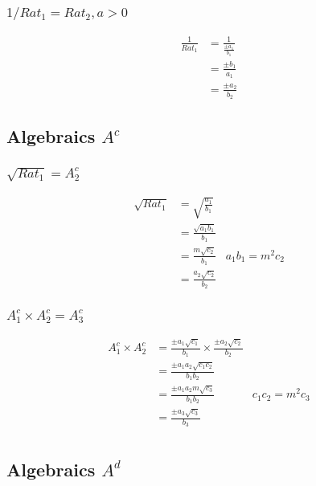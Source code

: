 \documentclass{article}
\begin{document}
\subsubsection{$1 / Rat_1 = Rat_2, a > 0$}
\begin{align*}
\frac{1}{Rat_1} &= \frac{1}{\frac{\pm a_1}{b_1}}\\
 &= \frac{\pm b_1}{a_1} \\
 &= \frac{\pm a_2}{b_2}
\end{align*}

\subsection{Algebraics $A^c$}

\subsubsection{$\sqrt{Rat_1} = A^c_2$}
\begin{align*}
\sqrt{Rat_1} &= \sqrt{\frac{a_1}{b_1}}\\
  &= \frac{\sqrt{a_1b_1}}{b_1}\\
  &= \frac{m\sqrt{c_2}}{b_1}    & a_1b_1 = m^2c_2\\
  &= \frac{a_2\sqrt{c_2}}{b_2}
\end{align*}

\subsubsection{$A^c_1 \times A^c_2 = A^c_3$}
\begin{align*}
A^c_1 \times A^c_2 &= \frac{\pm a_1\sqrt{c_1}}{b_1} \times \frac{\pm a_2\sqrt{c_2}}{b_2}\\
 &= \frac{\pm a_1a_2\sqrt{c_1c_2}}{b_1b_2}\\
 &= \frac{\pm a_1a_2m\sqrt{c_3}}{b_1b_2} & c_1c_2 = m^2c_3\\
 &= \frac{\pm a_3\sqrt{c_3}}{b_3}\\
\end{align*}

\subsection{Algebraics $A^d$}
\end{document}
